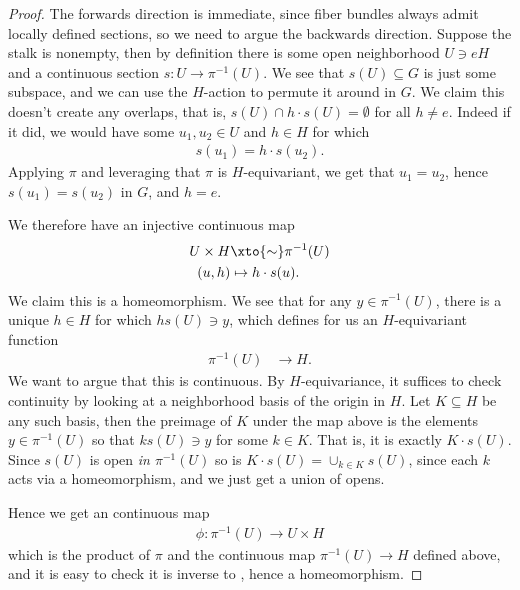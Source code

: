 \documentclass[11pt]{amsart}
\begin{document}
\begin{proof} The forwards direction is immediate, since fiber bundles always admit locally defined sections, so we need to argue the backwards direction. Suppose the stalk is nonempty, then by definition there is some open neighborhood $U \ni eH$ and a continuous section $s \colon U \to \pi^{-1}(U)$. We see that $s(U) \subseteq G$ is just some subspace, and we can use the $H$-action to permute it around in $G$. We claim this doesn't create any overlaps, that is, $s(U) \cap h\cdot s(U) = \emptyset$ for all $h\ne e$. Indeed if it did, we would have some $u_1,u_2\in U$ and $h\in H$ for which
\begin{align*}
    s(u_1) = h\cdot s(u_2).
\end{align*}
Applying $\pi$ and leveraging that $\pi$ is $H$-equivariant, we get that $u_1 = u_2$, hence $s(u_1) = s(u_2)$ in $G$, and $h= e$.

We therefore have an injective continuous map
\begin{equation}\label{eqn:UxH-to-piinvs-U}
\begin{aligned}
    U \times H &\xto{\sim} \pi^{-1}(U) \\
    (u,h) &\mapsto h\cdot s(u).
\end{aligned}
\end{equation}
We claim this is a homeomorphism. We see that for any $y\in \pi^{-1}(U)$, there is a unique $h\in H$ for which $hs(U) \ni y$, which defines for us an $H$-equivariant function
\begin{align*}
    \pi^{-1}(U) &\to H.
\end{align*}
We want to argue that this is continuous. By $H$-equivariance, it suffices to check continuity by looking at a neighborhood basis of the origin in $H$. Let $K \subseteq H$ be any such basis, then the preimage of $K$ under the map above is the elements $y\in \pi^{-1}(U)$ so that $ks(U) \ni y$ for some $k \in K$. That is, it is exactly $K\cdot s(U)$. Since $s(U)$ is open \emph{in $\pi^{-1}(U)$} so is $K\cdot s(U)= \cup_{k\in K}s(U)$, since each $k$ acts via a homeomorphism, and we just get a union of opens.

Hence we get an continuous map
\begin{align*}
    \phi \colon \pi^{-1}(U) \to U \times H
\end{align*}
which is the product of $\pi$ and the continuous map $\pi^{-1}(U) \to H$ defined above, and it is easy to check it is inverse to , hence a homeomorphism.


\end{proof}
\end{document}
